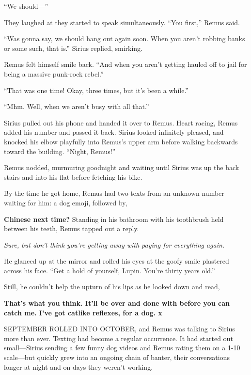 “We should—”

They laughed at they started to speak simultaneously. “You first,” Remus said.

“Was gonna say, we should hang out again soon. When you aren’t robbing banks or some such, that is.” Sirius replied, smirking.

Remus felt himself smile back. “And when you aren’t getting hauled off to jail for being a massive punk-rock rebel.”

“That was one time! Okay, three times, but it’s been a while.”

“Mhm. Well, when we aren’t busy with all that.”

Sirius pulled out his phone and handed it over to Remus. Heart racing, Remus added his number and passed it back. Sirius looked infinitely pleased, and knocked his elbow playfully into Remus’s upper arm before walking backwards toward the building. “Night, Remus!”

Remus nodded, murmuring goodnight and waiting until Sirius was up the back stairs and into his flat before fetching his bike.

By the time he got home, Remus had two texts from an unknown number waiting for him: a dog emoji, followed by,

\textbf{Chinese next time?
}
Standing in his bathroom with his toothbrush held between his teeth, Remus tapped out a reply.

\textit{Sure, but don’t think you’re getting away with paying for everything again.
}

He glanced up at the mirror and rolled his eyes at the goofy smile plastered across his face. “Get a hold of yourself, Lupin. You’re thirty years old.”

Still, he couldn’t help the upturn of his lips as he looked down and read,

\textbf{That’s what you think. It’ll be over and done with before you can catch me. I’ve got catlike reflexes, for a dog. x}


\newpage


SEPTEMBER ROLLED INTO OCTOBER, and Remus was talking to Sirius more than ever. Texting had become a regular occurrence. It had started out small—Sirius sending a few funny dog videos and Remus rating them on a 1-10 scale—but quickly grew into an ongoing chain of banter, their conversations longer at night and on days they weren’t working.

